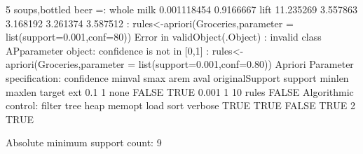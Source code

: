 \documentclass[a4paper,12pt]{article}
\begin{document}
{{5 {soups,bottled beer}    =: {whole milk}   0.001118454 0.9166667 
\newline
lift     
 11.235269
  3.557863
  3.168192
  3.261374
  3.587512
\newline
: rules<-apriori(Groceries,parameter = list(support=0.001,conf=80))
\newline
Error in validObject(.Object) : 
\newline
invalid class APparameter object: confidence is not in [0,1]
\newline
: rules<-apriori(Groceries,parameter = list(support=0.001,conf=0.80))
\newline
Apriori
}
Parameter specification:
\newline
confidence minval smax arem  aval originalSupport support minlen maxlen target   ext
    0.1    1 none FALSE            TRUE   0.001      1     10  rules FALSE
\newline
}
\newline
Algorithmic control:
\newline
filter tree heap memopt load sort verbose
 TRUE TRUE  FALSE TRUE    2    TRUE
\newline

Absolute minimum support count: 9 
\newline
\end{document}
